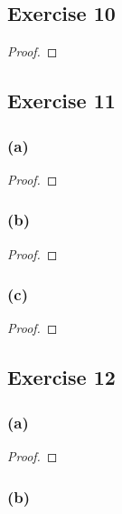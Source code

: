 \documentclass[14pt]{extarticle}
\begin{document}
\subsection{Exercise 10}

\begin{proof}

\end{proof}

\subsection{Exercise 11}
\subsubsection{(a)}

\begin{proof}

\end{proof}

\subsubsection{(b)}

\begin{proof}

\end{proof}

\subsubsection{(c)}

\begin{proof}

\end{proof}

\subsection{Exercise 12}

\subsubsection{(a)}

\begin{proof}

\end{proof}

\subsubsection{(b)}
\end{document}
